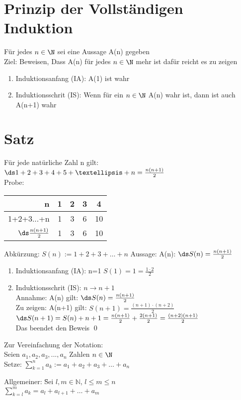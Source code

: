 \section{Prinzip der Vollständigen Induktion}
Für jedes $n \in \N$ sei eine Aussage A(n) gegeben\\
Ziel: Beweisen, Dass A(n) für jedes $n \in \N$ mehr ist dafür reicht es zu zeigen
\begin{enumerate}
\item Induktionsanfang (IA): A(1) ist wahr
\item Induktionsschrit (IS): Wenn für ein $n \in \N$ A(n) wahr ist, dann ist auch A(n+1) wahr
\end{enumerate}

\section{Satz}
Für jede natürliche Zahl n gilt: $\ds 1+2+3+4+5+…+n=\frac{n(n+1)}{2}$\\
Probe:\\
\begin{tabular}{r|c|c|c|c}
n & 1 & 2 & 3 & 4\\ \hline\hline
1+2+3...+n & 1 & 3 & 6 & 10\\ \hline
$\ds \frac{n(n+1)}{2}$ & 1 & 3 & 6 & 10\\
\end{tabular}

Abkürzung: $S(n) := 1+2+3+…+n$
Aussage: A(n): $\ds S(n) = \frac{n(n+1)}{2}$
\begin{enumerate}
\item Induktionsanfang (IA): n=1 $S(1) = 1 = \frac{1·2}{2}$
\item Induktionsschrit (IS): $n → n+1$\\
Annahme: A(n) gilt: $\ds S(n) = \frac{n(n+1)}{2}$\\
Zu zeigen: A(n+1) gilt: $S(n+1)=\frac{(n+1)\cdot(n+2)}{2}$\\
$\ds S(n+1)=S(n)+n+1=\frac{n(n+1)}{2}+\frac{2(n+1)}{2}=\frac{(n+2)(n+1)}{2}$\\
Das beendet den Beweis \qed\\
\end{enumerate}
Zur Vereinfachung der Notation:\\
Seien $a_1,a_2,a_3,...,a_n$ Zahlen $n \in \N$\\
Setze: $\sum_{k=1}^n a_k := a_1+a_2+a_3+…+a_n$\\
\begin{tabbing}
Allgemeiner: \=Sei $l,m \in \mathds{N}$, $l \le m \le n$\\
\>$\sum_{k=l}^m a_k = a_l+a_{l+1}+…+a_m$\\
\end{tabbing}


